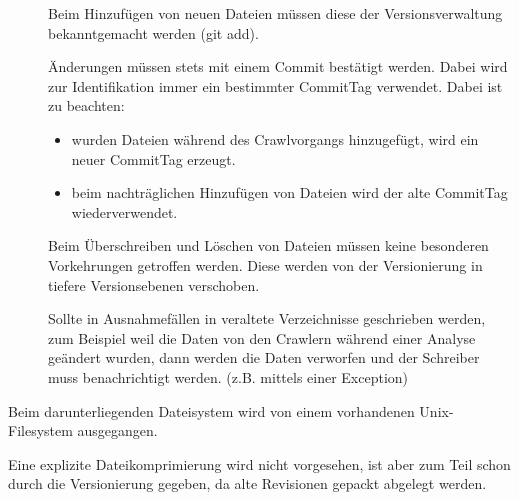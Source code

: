 \begin{description}
\begin{description}
			\item []
				Beim Hinzufügen von neuen Dateien müssen diese der Versionsverwaltung bekanntgemacht werden (git add).
			\item []
				Änderungen müssen stets mit einem Commit bestätigt werden.
				Dabei wird zur Identifikation immer ein bestimmter CommitTag verwendet.
				Dabei ist zu beachten:
				\begin{itemize}
					\item wurden Dateien während des Crawlvorgangs hinzugefügt,
						wird ein neuer CommitTag erzeugt.
					\item beim nachträglichen Hinzufügen von Dateien wird der alte CommitTag wiederverwendet.
				\end{itemize}
			\item []
				Beim Überschreiben und Löschen von Dateien müssen keine besonderen Vorkehrungen
				getroffen werden.
				Diese werden von der Versionierung in tiefere Versionsebenen verschoben.
			\item []
				Sollte in Ausnahmefällen in veraltete Verzeichnisse geschrieben werden, 
				zum Beispiel weil die Daten von den Crawlern während einer Analyse geändert wurden,
				dann werden die Daten verworfen und der Schreiber muss benachrichtigt werden.
				(z.B. mittels einer Exception)
		\end{description}
	\item [\req{Dateisystem}{fs}]
		Beim darunterliegenden Dateisystem wird von einem vorhandenen Unix-Filesystem ausgegangen.
	\item [\req{Komprimierung}{compress}]
		Eine explizite Dateikomprimierung wird nicht vorgesehen, 
		ist aber zum Teil schon durch die Versionierung gegeben, 
		da alte Revisionen gepackt abgelegt werden.
\end{description}



